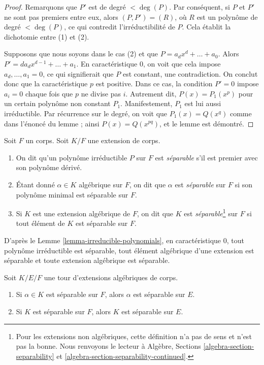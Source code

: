 \begin{proof}
Remarquons que $P'$ est de degré $< \deg(P)$. Par conséquent, si $P$ et $P'$ ne sont pas premiers
entre eux, alors $(P, P') = (R)$, où $R$ est un polynôme de degré $< \deg(P)$,
ce qui contredit l'irréductibilité de $P$. Cela établit la dichotomie
entre (1) et (2).

\medskip\noindent
Supposons que nous soyons dans le cas (2) et que $P = a_d x^d + \ldots + a_0$. Alors
$P' = da_d x^{d - 1} + \ldots + a_1$. En caractéristique $0$, on voit
que cela impose $a_d, \ldots, a_1 = 0$, ce qui signifierait que $P$ est constant,
une contradiction. On conclut donc que la caractéristique $p$ est positive.
Dans ce cas, la condition $P' = 0$ impose $a_i = 0$ chaque fois que $p$ ne
divise pas $i$.
Autrement dit, $P(x) = P_1(x^p)$ pour un certain polynôme non constant $P_1$.
Manifestement, $P_1$ est lui aussi irréductible. Par récurrence sur le degré, on
voit que $P_1(x) = Q(x^q)$ comme dans l'énoncé du lemme ; ainsi
$P(x) = Q(x^{pq})$, et le lemme est démontré.
\end{proof}

\begin{definition}
\label{definition-separable}
Soit $F$ un corps. Soit $K/F$ une extension de corps.
\begin{enumerate}
\item On dit qu'un polynôme irréductible $P$ sur $F$ est {\it séparable}
s'il est premier avec son polynôme dérivé.
\item Étant donné $\alpha \in K$ algébrique sur $F$, on dit que $\alpha$ est
{\it séparable} sur $F$ si son polynôme minimal est séparable sur $F$.
\item Si $K$ est une extension algébrique de $F$, on dit que $K$ est
{\it séparable}\footnote{Pour les extensions non algébriques,
cette définition n'a pas de sens et n'est pas la bonne. Nous renvoyons
le lecteur à Algèbre, Sections \ref{algebra-section-separability} et
\ref{algebra-section-separability-continued}.}
sur $F$ si tout élément de $K$ est séparable sur $F$.
\end{enumerate}
\end{definition}

\noindent
D'après le Lemme \ref{lemma-irreducible-polynomials}, en caractéristique $0$, tout
polynôme irréductible est séparable, tout élément algébrique d'une extension
est séparable et toute extension algébrique est séparable.

\begin{lemma}
\label{lemma-separable-goes-up}
Soit $K/E/F$ une tour d'extensions algébriques de corps.
\begin{enumerate}
\item Si $\alpha \in K$ est séparable sur $F$, alors $\alpha$ est séparable
sur $E$.
\item Si $K$ est séparable sur $F$, alors $K$ est séparable sur $E$.
\end{enumerate}
\end{lemma}

